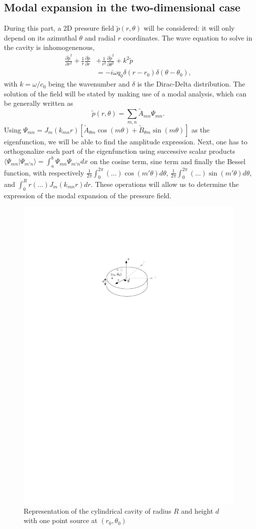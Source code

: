 \documentclass[%
 reprint,
 amsmath,amssymb,
 aip,
]{revtex4-1}
\begin{document}
\subsection{Modal expansion in the two-dimensional case}
During this part, a 2D pressure field $\tilde{p}(r, \theta)$ will be considered: it will only depend on its azimuthal $\theta$ and radial $r$ coordinates. The wave equation to solve in the cavity is inhomogenenous,
\begin{equation}
    \begin{split}
        \frac{\partial \tilde{p}^2}{\partial r^2} + \frac{1}{r} \frac{\partial \tilde{p}}{\partial r} &+ \frac{1}{r^2} \frac{\partial \tilde{p}^2}{\partial \theta^2} + k^2 \tilde{p}\\ &= -i \omega q_0 \delta(r - r_0) \delta(\theta - \theta_0),
    \end{split}
\end{equation}
with $k = \omega/c_0$ being the wavenumber and $\delta$ is the Dirac-Delta distribution. The solution of the field will be stated by making use of a modal analysis, which can be generally written as 
\begin{equation}
    \tilde{p}(r, \theta) = \sum_{m,n} \tilde{A}_{mn} \Psi_{mn}.
\end{equation}
Using $\Psi_{mn} = J_m (k_{mn}r)\left[ \tilde{A}_{\theta m} \cos(m \theta) + \tilde{B}_{\theta m} \sin(m \theta) \right]$ as the eigenfunction, we will be able to find the amplitude expression. Next, one has to orthogonalize each part of the eigenfunction using successive scalar products $\langle \Psi_{mn} | \Psi_{m'n} \rangle = \int_a^b  \Psi_{mn}\Psi_{m'n} dx $ on the cosine term, sine term and finally the Bessel function, with respectively $\frac{1}{2\pi}\int_0^{2\pi}(\ldots)\cos(m'\theta) d\theta$, $\frac{1}{2\pi}\int_0^{2\pi}(\ldots)\sin(m'\theta) d\theta$, and $\int_0^R r (\ldots) J_m(k_{mn}r)dr$. These operations will allow us to determine the expression of the modal expansion of the pressure field.\\

\begin{figure}
    \centering
    \includegraphics[width=.35\textwidth]{figures/schema.pdf}
    \caption{Representation of the cylindrical cavity of radius $R$ and height $d$ with one point source at $(r_0, \theta_0)$}
    \label{fig:schema}
\end{figure}
\end{document}
